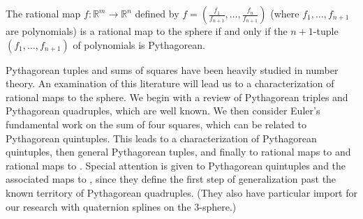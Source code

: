 \documentclass[12pt]{article}
\begin{document}
\begin{lemma}
\label{lem:ratpy}
The rational map $f: \mathbb{R}^m \rightarrow \mathbb{R}^n$ defined by 
$f = (\frac{f_1}{f_{n+1}},\ldots,\frac{f_n}{f_{n+1}})$ (where $f_1,\ldots,f_{n+1}$
are polynomials) is a rational map 
to the sphere  if and only if
the $n+1$-tuple $(f_1,\ldots,f_{n+1})$ of polynomials is Pythagorean.
\end{lemma}





Pythagorean tuples and sums of squares have been heavily studied in number theory.
An examination of this literature will lead us to a characterization of rational maps
to the sphere.
We begin with a review of Pythagorean triples and Pythagorean quadruples,
which are well known.
We then consider Euler's fundamental work on the sum of four squares,
which can be related to Pythagorean quintuples.
This leads to a characterization of Pythagorean quintuples, then general 
Pythagorean tuples, and finally to rational maps to 
and rational maps to .
Special attention is given to Pythagorean quintuples and the associated
maps to , since they define the first step of generalization past
the known territory of Pythagorean quadruples.
(They also have particular import for our research with quaternion splines
on the 3-sphere.)
\end{document}

